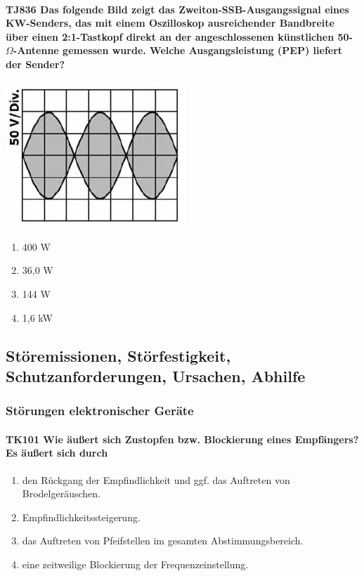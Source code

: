 \documentclass[8pt]{article}
\begin{document}
\paragraph*{TJ836 Das folgende Bild zeigt das Zweiton-SSB-Ausgangssignal eines KW-Senders, das mit einem Oszilloskop ausreichender Bandbreite über einen 2:1-Tastkopf direkt an der angeschlossenen künstlichen 50-$\Omega$-Antenne gemessen wurde. Welche Ausgangsleistung (PEP) liefert der Sender?}
\begin{center}
	\begin{minipage}{\linewidth}
		\centering
		\includegraphics[scale=1.0]{pics/tj836_a.jpg}
	\end{minipage}
\end{center}
\begin{enumerate}[nolistsep,label=\Alph*]
\item 400 W
\item 36,0 W
\item 144 W
\item 1,6 kW
\end{enumerate}

\pagebreak
\subsection{Störemissionen, Störfestigkeit, Schutzanforderungen, Ursachen, Abhilfe}
\subsubsection{Störungen elektronischer Geräte}

\paragraph*{TK101 Wie äußert sich Zustopfen bzw. Blockierung eines Empfängers? Es äußert sich durch} 
\begin{enumerate}[nolistsep,label=\Alph*]
\item den Rückgang der Empfindlichkeit und ggf. das Auftreten von Brodelgeräuschen.
\item Empfindlichkeitssteigerung. 
\item das Auftreten von Pfeifstellen im gesamten Abstimmungsbereich.
\item eine zeitweilige Blockierung der Frequenzeinstellung.
\end{enumerate}
\end{document}
